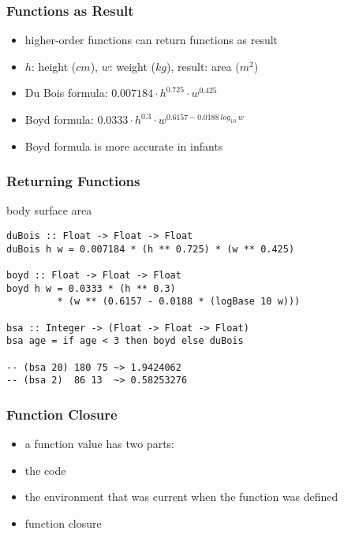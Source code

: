 \documentclass[dvipsnames]{beamer}
\theoremstyle{plain}
\begin{document}
\begin{frame}
  \frametitle{Functions as Result}

  \begin{itemize}
    \item higher-order functions can return functions as result
  \end{itemize}

  \begin{example}
    \begin{itemize}
      \item $h$: height ($cm$), $w$: weight ($kg$), result: area ($m^2$)
      \smallskip
      \item Du Bois formula:
        $0.007184 \cdot h^{0.725} \cdot w^{0.425}$\\
      \smallskip
      \item Boyd formula:
        $0.0333 \cdot h^{0.3} \cdot w^{0.6157 - 0.0188~log_{10}~w}$
      \smallskip
      \item Boyd formula is more accurate in infants
    \end{itemize}
  \end{example}
\end{frame}

\begin{frame}[fragile]
  \frametitle{Returning Functions}

  \begin{exampleblock}{body surface area}
    \begin{lstlisting}
duBois :: Float -> Float -> Float
duBois h w = 0.007184 * (h ** 0.725) * (w ** 0.425)

boyd :: Float -> Float -> Float
boyd h w = 0.0333 * (h ** 0.3)
         * (w ** (0.6157 - 0.0188 * (logBase 10 w)))

bsa :: Integer -> (Float -> Float -> Float)
bsa age = if age < 3 then boyd else duBois

-- (bsa 20) 180 75 ~> 1.9424062
-- (bsa 2)  86 13  ~> 0.58253276
    \end{lstlisting}
  \end{exampleblock}
\end{frame}

\begin{frame}[fragile]
  \frametitle{Function Closure}

  \begin{itemize}
    \item a function value has two parts:

    \medskip
    \item the code
    \item the environment that was current when the function was defined

    \medskip
    \item function \alert{closure}
  \end{itemize}
\end{frame}
\end{document}

